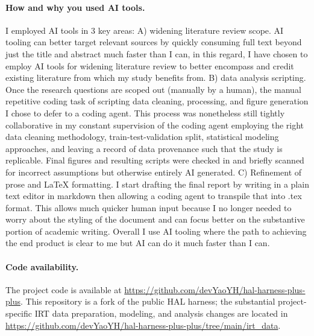 \documentclass{article}
\begin{document}
\paragraph{How and why you used AI tools.} I employed AI tools in 3 key areas: A) widening literature review scope. AI tooling can better target relevant sources by quickly consuming full text beyond just the title and abstract much faster than I can, in this regard, I have chosen to employ AI tools for widening literature review to better encompass and credit existing literature from which my study benefits from. B) data analysis scripting. Once the research questions are scoped out (manually by a human), the manual repetitive coding task of scripting data cleaning, processing, and figure generation I chose to defer to a coding agent. This process was nonetheless still tightly collaborative in my constant supervision of the coding agent employing the right data cleaning methodology, train-test-validation split, statistical modeling approaches, and leaving a record of data provenance such that the study is replicable. Final figures and resulting scripts were checked in and briefly scanned for incorrect assumptions but otherwise entirely AI generated. C) Refinement of prose and LaTeX formatting. I start drafting the final report by writing in a plain text editor in markdown then allowing a coding agent to transpile that into .tex format. This allows much quicker human input because I no longer needed to worry about the styling of the document and can focus better on the substantive portion of academic writing. Overall I use AI tooling where the path to achieving the end product is clear to me but AI can do it much faster than I can.

\paragraph{Code availability.} The project code is available at \url{https://github.com/devYaoYH/hal-harness-plus-plus}. This repository is a fork of the public HAL harness; the substantial project-specific IRT data preparation, modeling, and analysis changes are located in \url{https://github.com/devYaoYH/hal-harness-plus-plus/tree/main/irt_data}.
\end{document}
